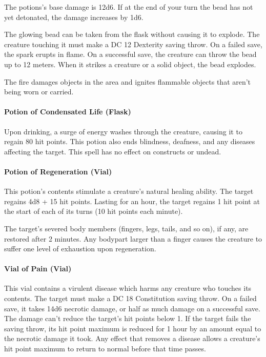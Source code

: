     The potions's base damage is 12d6.
    If at the end of your turn the bead has not yet detonated, the damage increases by 1d6.

    The glowing bead can be taken from the flask without causing it to explode.
    The creature touching it must make a DC 12 Dexterity saving throw.
    On a failed save, the spark erupts in flame.
    On a successful save, the creature can throw the bead up to 12 meters.
    When it strikes a creature or a solid object, the bead explodes.

    The fire damages objects in the area and ignites flammable objects that aren't being worn or carried.
\paragraph{Potion of Condensated Life (Flask)} %
    Upon drinking, a surge of energy washes through the creature, causing it to regain 80 hit points.
    This potion also ends blindness, deafness, and any diseases affecting the target.
    This spell has no effect on constructs or undead.
\paragraph{Potion of Regeneration (Vial)} %
    This potion's contents stimulate a creature's natural healing ability.
    The target regains 4d8 + 15 hit points.
    Lasting for an hour, the target regains 1 hit point at the start of each of its turns (10 hit points each minute).

    The target's severed body members (fingers, legs, tails, and so on), if any, are restored after 2 minutes.
    Any bodypart larger than a finger causes the creature to suffer one level of exhaustion upon regeneration.
\paragraph{Vial of Pain (Vial)} %
    This vial contains a virulent disease which harms any creature who touches its contents.
    The target must make a DC 18 Constitution saving throw.
    On a failed save, it takes 14d6 necrotic damage, or half as much damage on a successful save.
    The damage can't reduce the target's hit points below 1.
    If the target fails the saving throw, its hit point maximum is reduced for 1 hour by an amount equal to the necrotic damage it took.
    Any effect that removes a disease allows a creature's hit point maximum to return to normal before that time passes.
